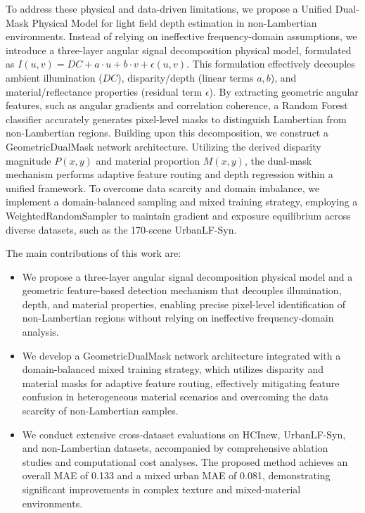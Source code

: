 \documentclass[lettersize,journal]{IEEEtran}
\begin{document}
To address these physical and data-driven limitations, we propose a Unified Dual-Mask Physical Model for light field depth estimation in non-Lambertian environments. Instead of relying on ineffective frequency-domain assumptions, we introduce a three-layer angular signal decomposition physical model, formulated as $I(u,v) = DC + a \cdot u + b \cdot v + \epsilon(u,v)$. This formulation effectively decouples ambient illumination ($DC$), disparity/depth (linear terms $a, b$), and material/reflectance properties (residual term $\epsilon$). By extracting geometric angular features, such as angular gradients and correlation coherence, a Random Forest classifier accurately generates pixel-level masks to distinguish Lambertian from non-Lambertian regions. Building upon this decomposition, we construct a GeometricDualMask network architecture. Utilizing the derived disparity magnitude $P(x,y)$ and material proportion $M(x,y)$, the dual-mask mechanism performs adaptive feature routing and depth regression within a unified framework. To overcome data scarcity and domain imbalance, we implement a domain-balanced sampling and mixed training strategy, employing a WeightedRandomSampler to maintain gradient and exposure equilibrium across diverse datasets, such as the 170-scene UrbanLF-Syn.

The main contributions of this work are:
\begin{itemize}
\item We propose a three-layer angular signal decomposition physical model and a geometric feature-based detection mechanism that decouples illumination, depth, and material properties, enabling precise pixel-level identification of non-Lambertian regions without relying on ineffective frequency-domain analysis.
\item We develop a GeometricDualMask network architecture integrated with a domain-balanced mixed training strategy, which utilizes disparity and material masks for adaptive feature routing, effectively mitigating feature confusion in heterogeneous material scenarios and overcoming the data scarcity of non-Lambertian samples.
\item We conduct extensive cross-dataset evaluations on HCInew, UrbanLF-Syn, and non-Lambertian datasets, accompanied by comprehensive ablation studies and computational cost analyses. The proposed method achieves an overall MAE of 0.133 and a mixed urban MAE of 0.081, demonstrating significant improvements in complex texture and mixed-material environments.
\end{itemize}
\end{document}
